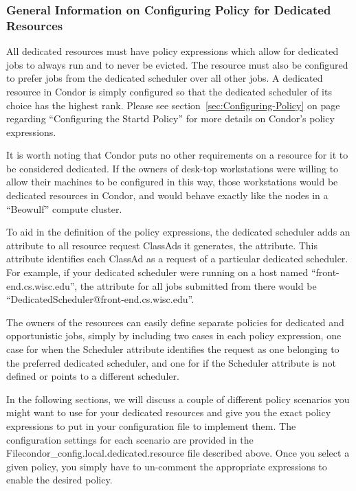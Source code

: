 \subsubsection{\label{sec:Configure-Dedicated-Policy}
General Information on Configuring Policy for Dedicated Resources}

All dedicated resources must have policy expressions which allow for
dedicated jobs to always run and to never be evicted.
The resource must also be configured to prefer jobs from the dedicated 
scheduler over all other jobs.
A dedicated resource in Condor is simply configured so that the
dedicated scheduler of its choice has the highest rank.
Please see section~\ref{sec:Configuring-Policy} on
page~\pageref{sec:Configuring-Policy} regarding ``Configuring the
Startd Policy'' for more details on Condor's policy expressions. 

It is worth noting that Condor puts no other requirements on a
resource for it to be considered dedicated.  
If the owners of desk-top workstations were willing to allow their
machines to be configured in this way, those workstations would be
dedicated resources in Condor, and would behave exactly like the nodes
in a ``Beowulf'' compute cluster.

To aid in the definition of the policy expressions, the dedicated
scheduler adds an attribute to all resource request ClassAds it
generates, the  attribute.
This attribute identifies each ClassAd as a request of a particular
dedicated scheduler.
For example, if your dedicated scheduler were running on a host named
``front-end.cs.wisc.edu'', the  attribute for all jobs
submitted from there would be
``DedicatedScheduler@front-end.cs.wisc.edu''. 

The owners of the resources can easily define separate policies for
dedicated and opportunistic jobs, simply by including two cases in
each policy expression, one case for when the Scheduler attribute
identifies the request as one belonging to the preferred dedicated
scheduler, and one for if the Scheduler attribute is not defined or
points to a different scheduler.

In the following sections, we will discuss a couple of different
policy scenarios you might want to use for your dedicated resources
and give you the exact policy expressions to put in your configuration
file to implement them.
The configuration settings for each scenario are provided in the
File{condor\_config.local.dedicated.resource} file described above.
Once you select a given policy, you simply have to un-comment the
appropriate expressions to enable the desired policy.

